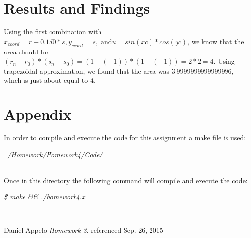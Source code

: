 \documentclass[12pt]{article}
\theoremstyle{definition}
\theoremstyle{definition}
\begin{document}
\section{Results and Findings}
Using the first combination with \(x_{coord} = r+0.1d0*s, y_{coord} = s,\text{ and} u = sin(xc)*cos(yc)\), we know that the area should be \((r_{n}-r_{0})*(s_{n}-s_{0}) = (1-(-1)) * (1-(-1)) = 2*2 = 4\). Using trapezoidal approximation, we found that the area was 3.9999999999999996, which is just about equal to 4.
\newpage
\section{Appendix}
\indent In order to compile and execute the code for this assignment a make file is used:
\\
\begin{center}
\textit{~/Homework/Homework4/Code/}
\end{center}
\\
Once in this directory the following command will compile and execute the code:
\\
\begin{center}
\textit{\$ make \&\& ./homework4.x}
\end{center}
\\

\newpage
\begin{thebibliography}{9}
Daniel Appelo
\textit{Homework 3}. 
referenced Sep. 26, 2015

\end{thebibliography}
\end{document}
